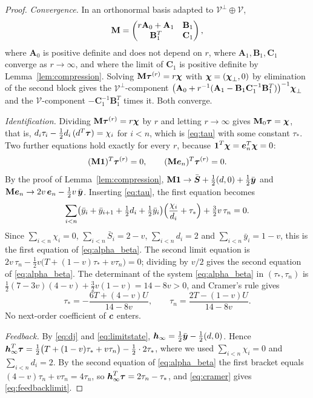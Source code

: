 \begin{proof}
\emph{Convergence.} In an orthonormal basis adapted to \(\mathcal V^{\perp}\oplus\mathcal V\),
\[
 \mathbf M=\begin{pmatrix}r\mathbf A_0+\mathbf A_1&\mathbf B_1\\ \mathbf B_1^{T}&\mathbf C_1\end{pmatrix},
\]
where \(\mathbf A_0\) is positive definite and does not depend on \(r\), where
\(\mathbf A_1,\mathbf B_1,\mathbf C_1\) converge as \(r\to\infty\), and where the limit of
\(\mathbf C_1\) is positive definite by Lemma~\ref{lem:compression}. Solving
\(\mathbf M\boldsymbol\tau^{(r)}=r\boldsymbol\chi\) with \(\boldsymbol\chi=(\boldsymbol\chi_\perp,0)\) by elimination of the second block
gives the \(\mathcal V^\perp\)-component
\(\bigl(\mathbf A_0+r^{-1}(\mathbf A_1-\mathbf B_1\mathbf C_1^{-1}\mathbf B_1^{T})\bigr)^{-1}\boldsymbol\chi_\perp\)
and the \(\mathcal V\)-component \(-\mathbf C_1^{-1}\mathbf B_1^{T}\) times it. Both converge.

\emph{Identification.} Dividing \(\mathbf M\boldsymbol\tau^{(r)}=r\boldsymbol\chi\) by \(r\) and letting \(r\to\infty\)
gives \(\mathbf M_0\boldsymbol\tau=\boldsymbol\chi\), that is,
\(d_i\tau_i-\tfrac12d_i\,(d^{T}\boldsymbol\tau)=\chi_i\) for \(i<n\), which is \eqref{eq:tau} with some
constant \(\tau_\ast\). Two further equations hold exactly for every \(r\), because
\(\boldsymbol 1^{T}\boldsymbol\chi=\boldsymbol e_n^{T}\boldsymbol\chi=0\):
\[
 (\mathbf M\boldsymbol 1)^{T}\boldsymbol\tau^{(r)}=0,\qquad (\mathbf M\boldsymbol e_n)^{T}\boldsymbol\tau^{(r)}=0 .
\]
By the proof of Lemma~\ref{lem:compression}, \(\mathbf M\boldsymbol 1\to\bar{\boldsymbol S}+\tfrac12(d,0)+\tfrac12\bar{\boldsymbol y}\)
and \(\mathbf M\boldsymbol e_n\to2v\,\boldsymbol e_n-\tfrac12v\,\bar{\boldsymbol y}\). Inserting \eqref{eq:tau}, the first equation
becomes
\[
 \sum_{i<n}\bigl(\bar y_i+\bar y_{i+1}+\tfrac12d_i+\tfrac12\bar y_i\bigr)
 \Bigl(\frac{\chi_i}{d_i}+\tau_\ast\Bigr)+\tfrac32v\,\tau_n=0 .
\]
Since \(\sum_{i<n}\chi_i=0\), \(\sum_{i<n}\bar S_i=2-v\), \(\sum_{i<n}d_i=2\) and
\(\sum_{i<n}\bar y_i=1-v\), this is the first equation of \eqref{eq:alpha_beta}. The second
limit equation is \(2v\,\tau_n-\tfrac12v\bigl(T+(1-v)\tau_\ast+v\tau_n\bigr)=0\); dividing by
\(v/2\) gives the second equation of \eqref{eq:alpha_beta}. The determinant of the system
\eqref{eq:alpha_beta} in \((\tau_\ast,\tau_n)\) is \(\tfrac12(7-3v)(4-v)+\tfrac32v(1-v)=14-8v>0\),
and Cramer's rule gives
\begin{equation}\label{eq:cramer}
 \tau_\ast=-\frac{6T+(4-v)U}{14-8v},\qquad \tau_n=\frac{2T-(1-v)U}{14-8v}.
\end{equation}
No next-order coefficient of \(\boldsymbol c\) enters.

\emph{Feedback.} By \eqref{eq:dj} and \eqref{eq:limitstate},
\(\boldsymbol h_\infty=\tfrac12\bar{\boldsymbol y}-\tfrac12(d,0)\). Hence
\(\boldsymbol h_\infty^{T}\boldsymbol\tau=\tfrac12\bigl(T+(1-v)\tau_\ast+v\tau_n\bigr)-\tfrac12\cdot2\tau_\ast\),
where we used \(\sum_{i<n}\chi_i=0\) and \(\sum_{i<n}d_i=2\). By the second equation of
\eqref{eq:alpha_beta} the first bracket equals \((4-v)\tau_n+v\tau_n=4\tau_n\), so
\(\boldsymbol h_\infty^{T}\boldsymbol\tau=2\tau_n-\tau_\ast\), and \eqref{eq:cramer} gives \eqref{eq:feedbacklimit}.
\end{proof}

